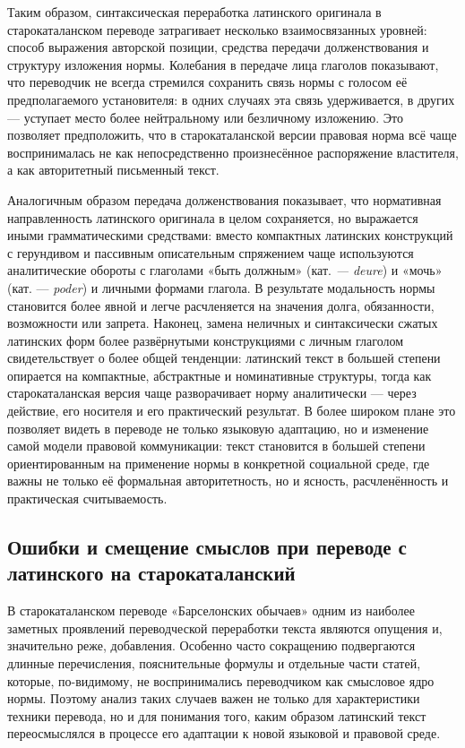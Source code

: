 Таким образом, синтаксическая переработка латинского оригинала в старокаталанском переводе затрагивает несколько взаимосвязанных уровней: способ выражения авторской позиции, средства передачи долженствования и структуру изложения нормы. Колебания в передаче лица глаголов показывают, что переводчик не всегда стремился сохранить связь нормы с голосом её предполагаемого установителя: в одних случаях эта связь удерживается, в других --- уступает место более нейтральному или безличному изложению. Это позволяет предположить, что в старокаталанской версии правовая норма всё чаще воспринималась не как непосредственно произнесённое распоряжение властителя, а как авторитетный письменный текст.

Аналогичным образом передача долженствования показывает, что нормативная направленность латинского оригинала в целом сохраняется, но выражается иными грамматическими средствами: вместо компактных латинских конструкций с герундивом и пассивным описательным спряжением чаще используются аналитические обороты с глаголами «быть должным»\emph{ }(кат. \emph{--- deure}) и «мочь» (кат. ---\emph{ poder})\emph{ }и личными формами глагола. В результате модальность нормы становится более явной и легче расчленяется на значения долга, обязанности, возможности или запрета. Наконец, замена неличных и синтаксически сжатых латинских форм более развёрнутыми конструкциями с личным глаголом свидетельствует о более общей тенденции: латинский текст в большей степени опирается на компактные, абстрактные и номинативные структуры, тогда как старокаталанская версия чаще разворачивает норму аналитически --- через действие, его носителя и его практический результат. В более широком плане это позволяет видеть в переводе не только языковую адаптацию, но и изменение самой модели правовой коммуникации: текст становится в большей степени ориентированным на применение нормы в конкретной социальной среде, где важны не только её формальная авторитетность, но и ясность, расчленённость и практическая считываемость.

\subsection{Ошибки и смещение смыслов при переводе с латинского на старокаталанский}

В старокаталанском переводе «Барселонских обычаев» одним из наиболее заметных проявлений переводческой переработки текста являются опущения и, значительно реже, добавления. Особенно часто сокращению подвергаются длинные перечисления, пояснительные формулы и отдельные части статей, которые, по-видимому, не воспринимались переводчиком как смысловое ядро нормы. Поэтому анализ таких случаев важен не только для характеристики техники перевода, но и для понимания того, каким образом латинский текст переосмыслялся в процессе его адаптации к новой языковой и правовой среде.

